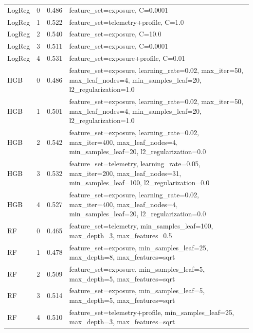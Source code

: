 \begin{longtable}{llcp{}}
LogReg & 0 & 0.486 & \footnotesize feature\_set=exposure, C=0.0001 \\
LogReg & 1 & 0.522 & \footnotesize feature\_set=telemetry+profile, C=1.0 \\
LogReg & 2 & 0.540 & \footnotesize feature\_set=exposure, C=10.0 \\
LogReg & 3 & 0.511 & \footnotesize feature\_set=exposure, C=0.0001 \\
LogReg & 4 & 0.531 & \footnotesize feature\_set=exposure+profile, C=0.01 \\
HGB & 0 & 0.486 & \footnotesize feature\_set=exposure, learning\_rate=0.02, max\_iter=50, max\_leaf\_nodes=4, min\_samples\_leaf=20, l2\_regularization=1.0 \\
HGB & 1 & 0.501 & \footnotesize feature\_set=exposure, learning\_rate=0.02, max\_iter=50, max\_leaf\_nodes=4, min\_samples\_leaf=20, l2\_regularization=1.0 \\
HGB & 2 & 0.542 & \footnotesize feature\_set=exposure, learning\_rate=0.02, max\_iter=400, max\_leaf\_nodes=4, min\_samples\_leaf=20, l2\_regularization=0.0 \\
HGB & 3 & 0.532 & \footnotesize feature\_set=telemetry, learning\_rate=0.05, max\_iter=200, max\_leaf\_nodes=31, min\_samples\_leaf=100, l2\_regularization=0.0 \\
HGB & 4 & 0.527 & \footnotesize feature\_set=exposure, learning\_rate=0.02, max\_iter=400, max\_leaf\_nodes=4, min\_samples\_leaf=20, l2\_regularization=0.0 \\
RF & 0 & 0.465 & \footnotesize feature\_set=telemetry, min\_samples\_leaf=100, max\_depth=3, max\_features=0.5 \\
RF & 1 & 0.478 & \footnotesize feature\_set=exposure, min\_samples\_leaf=25, max\_depth=8, max\_features=sqrt \\
RF & 2 & 0.509 & \footnotesize feature\_set=exposure, min\_samples\_leaf=5, max\_depth=5, max\_features=sqrt \\
RF & 3 & 0.514 & \footnotesize feature\_set=exposure, min\_samples\_leaf=5, max\_depth=5, max\_features=sqrt \\
RF & 4 & 0.510 & \footnotesize feature\_set=telemetry+profile, min\_samples\_leaf=25, max\_depth=3, max\_features=sqrt \\
\bottomrule
\end{longtable}

